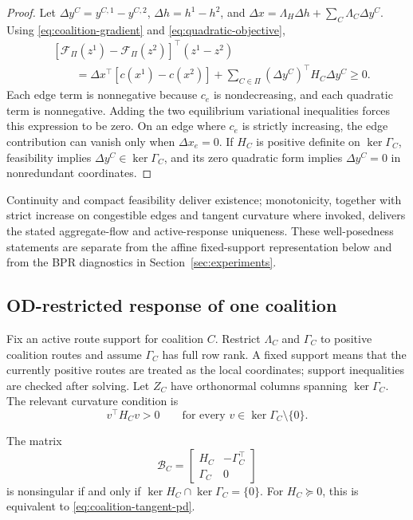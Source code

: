 \begin{proof}
Let $\Delta y^C=y^{C,1}-y^{C,2}$, $\Delta h=h^1-h^2$, and $\Delta x=\Lambda_H\Delta h+\sum_C\Lambda_C\Delta y^C$. Using \eqref{eq:coalition-gradient} and \eqref{eq:quadratic-objective},
\begin{align*}
 &[\mathcal F_\Pi(z^1)-\mathcal F_\Pi(z^2)]^\top(z^1-z^2)\\
 &\qquad=\Delta x^\top[c(x^1)-c(x^2)]
 +\sum_{C\in\Pi}(\Delta y^C)^\top H_C\Delta y^C\geq0.
\end{align*}
Each edge term is nonnegative because $c_e$ is nondecreasing, and each quadratic term is nonnegative. Adding the two equilibrium variational inequalities forces this expression to be zero. On an edge where $c_e$ is strictly increasing, the edge contribution can vanish only when $\Delta x_e=0$. If $H_C$ is positive definite on $\ker\Gamma_C$, feasibility implies $\Delta y^C\in\ker\Gamma_C$, and its zero quadratic form implies $\Delta y^C=0$ in nonredundant coordinates.
\end{proof}

Continuity and compact feasibility deliver existence; monotonicity, together with strict increase on congestible edges and tangent curvature where invoked, delivers the stated aggregate-flow and active-response uniqueness. These well-posedness statements are separate from the affine fixed-support representation below and from the BPR diagnostics in Section~\ref{sec:experiments}.

\subsection{OD-restricted response of one coalition}\label{sec:coalition_response}

Fix an active route support for coalition $C$. Restrict $\Lambda_C$ and $\Gamma_C$ to positive coalition routes and assume $\Gamma_C$ has full row rank. A fixed support means that the currently positive routes are treated as the local coordinates; support inequalities are checked after solving. Let $Z_C$ have orthonormal columns spanning $\ker\Gamma_C$. The relevant curvature condition is
\begin{equation}\label{eq:coalition-tangent-pd}
 v^\top H_Cv>0
 \qquad\text{for every }v\in\ker\Gamma_C\setminus\{0\}.
\end{equation}

\begin{lemma}\label{lem:coalition-bordered}
The matrix
\begin{equation}\label{eq:coalition-bordered}
 \mathcal B_C=\begin{bmatrix}H_C&-\Gamma_C^\top\\\Gamma_C&0\end{bmatrix}
\end{equation}
is nonsingular if and only if $\ker H_C\cap\ker\Gamma_C=\{0\}$. For $H_C\succeq0$, this is equivalent to \eqref{eq:coalition-tangent-pd}.
\end{lemma}

